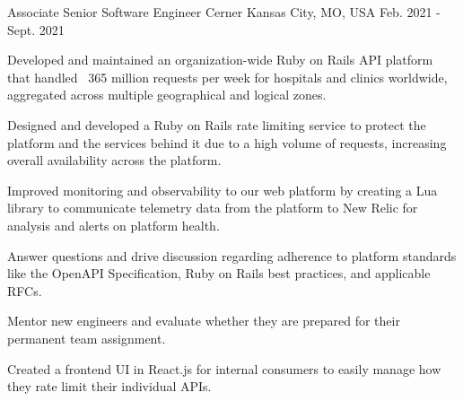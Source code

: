 \begin{cventries}
  \cventry
  {Associate Senior Software Engineer} %
  {Cerner} %
  {Kansas City, MO, USA} %
  {Feb. 2021 - Sept. 2021} %
  {
    \begin{cvitems} %
      \item {Developed and maintained an organization-wide Ruby on Rails API platform that handled ~365 million requests per week for hospitals and clinics worldwide, aggregated across multiple geographical and logical zones.}
      \item {Designed and developed a Ruby on Rails rate limiting service to protect the platform and the services behind it due to a high volume of requests, increasing overall availability across the platform.}
      \item {Improved monitoring and observability to our web platform by creating a Lua library to communicate telemetry data from the platform to New Relic for analysis and alerts on platform health.}
      \item {Answer questions and drive discussion regarding adherence to platform standards like the OpenAPI Specification, Ruby on Rails best practices, and applicable RFCs.}
      \item {Mentor new engineers and evaluate whether they are prepared for their permanent team assignment.}
      \item {Created a frontend UI in React.js for internal consumers to easily manage how they rate limit their individual APIs.}
    \end{cvitems}
  }


\end{cventries}
